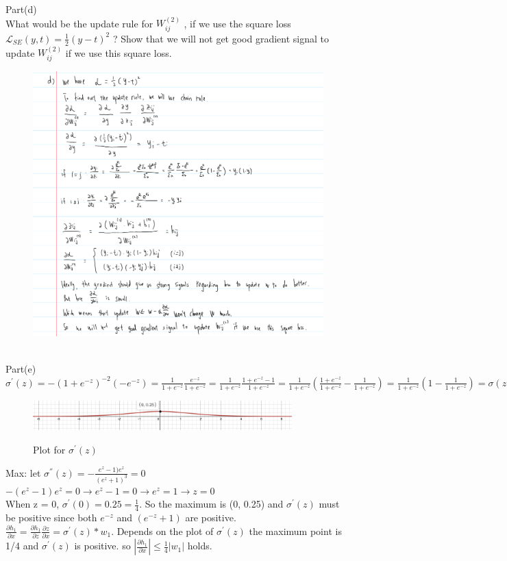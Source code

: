 \documentclass[12pt]{article}
\begin{document}
Part(d)\\
What would be the update rule for  $W^{(2)}_{ij}$ , if we use the square loss  $\mathcal{L}_{SE}(y, t) = \frac{1}{2}(y-t)^2$  ?
Show that we will not get good gradient signal to update  $W^{(2)}_{ij}$  if we use this square loss.\\
\begin{figure}[H]
    \centering
    \includegraphics[width=170mm,scale=2]{2d}\

\end{figure}

Part(e)\\
$\sigma^{'} (z)  = -(1+e^{-z})^{-2}(-e^{-z}) = \frac{1}{1+e^{-z}}\frac{e^{-z}}{1+e^{-z}} = \frac{1}{1+e^{-z}}\frac{1+e^{-z}-1}{1+e^{-z}}
= \frac{1}{1+e^{-z}}(\frac{1+e^{-z}}{1+e^{-z}} - \frac{1}{1+e^{-z}}) = \frac{1}{1+e^{-z}}(1-\frac{1}{1+e^{-z}}) = \sigma(z)(1-\sigma(z))$\\
\begin{figure}[H]
    \centering
    \includegraphics[width=100mm,scale=0.5]{e}\
    \caption{Plot for $\sigma^{'}(z)$}
\end{figure}
Max: let $\sigma^{''}(z) = -\frac{e^z-1)e^z}{(e^z+1)^3} = 0$\\
$-(e^z-1)e^z = 0 \rightarrow e^z-1 = 0 \rightarrow e^{z} = 1 \rightarrow z = 0$\\ 
When z = 0, $\sigma^{'}(0) = 0.25 = \frac{1}{4}$. So the maximum is (0, 0.25) and $\sigma^{'}(z)$ must be positive since both $e^{-z} $ and $(e^{-z}+1) $ are positive. \\
$\frac{\partial h_1 }{\partial x} = \frac{\partial h_1 }{\partial z}\frac{\partial z}{\partial x} = \sigma^{'}(z)*w_1$. Depends on the plot of $\sigma^{'}(z)$ the maximum point is 1/4 and  $\sigma^{'}(z)$ is positive. so $|\frac{\partial h_1 }{\partial x}| \leq \frac{1}{4}|w_1|$ holds.\\
\end{document}
